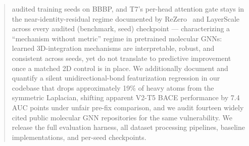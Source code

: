 \begin{abstract}
audited training seeds on BBBP, and T7's per-head attention gate stays
in the near-identity-residual regime documented by
ReZero~\cite{bachlechner2021rezero} and LayerScale~\cite{touvron2021cait}
across every audited (benchmark, seed) checkpoint --- characterizing a
``mechanism without metric'' regime in pretrained molecular GNNs:
learned 3D-integration mechanisms are interpretable, robust, and
consistent across seeds, yet do not translate to predictive improvement
once a matched 2D control is in place. We additionally document and
quantify a silent unidirectional-bond featurization regression in our
codebase that drops approximately 19\% of heavy atoms from the symmetric
Laplacian, shifting apparent V2-T5 BACE performance by 7.4 AUC points
under unfair pre-fix comparison, and we audit fourteen widely cited
public molecular GNN repositories for the same vulnerability. We
release the full evaluation harness, all dataset processing pipelines,
baseline implementations, and per-seed checkpoints.
\end{abstract}


